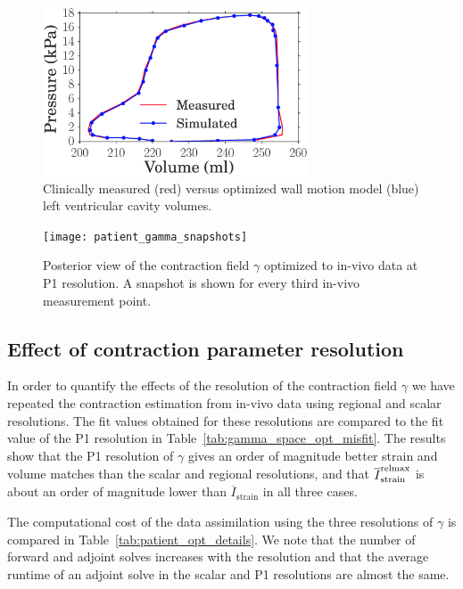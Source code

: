 \begin{figure}[htbp]
\centering
    \includegraphics[width=0.7\textwidth]{simulated_pv_loop}
\caption{Clinically measured (red) versus optimized wall motion model
  (blue) left ventricular cavity volumes.}
\label{fig:pv_match}
\end{figure}

\begin{figure}[htbp]
\centering
    \texttt{[image: patient\_gamma\_snapshots]}
\caption{Posterior view of the contraction field $\gamma$ optimized to in-vivo data 
at P1 resolution. A snapshot is shown for every third in-vivo measurement point.}
\label{fig:snap_shots}
\end{figure}


\subsection{Effect of contraction parameter resolution}
In order to quantify the effects of the resolution of the contraction field $\gamma$
we have repeated the contraction estimation from in-vivo data using regional and scalar resolutions.
The fit values obtained for these resolutions are compared to the fit value of the P1 resolution in Table~\ref{tab:gamma_space_opt_misfit}.
The results show that the P1 resolution of $\gamma$ gives an order of magnitude better strain and volume
matches than the scalar and regional resolutions, and that $\overline{I}^{\text{relmax}}_{\text{strain}}$
is about an order of magnitude lower than $\overline{I}_{\mathrm{strain}}$ in all three cases.

The computational cost of the data assimilation using the three resolutions of $\gamma$ is compared in 
Table~\ref{tab:patient_opt_details}. We note that the number of forward and adjoint solves 
increases with the resolution and that the average runtime of an adjoint solve in the scalar and P1 resolutions
are almost the same.

